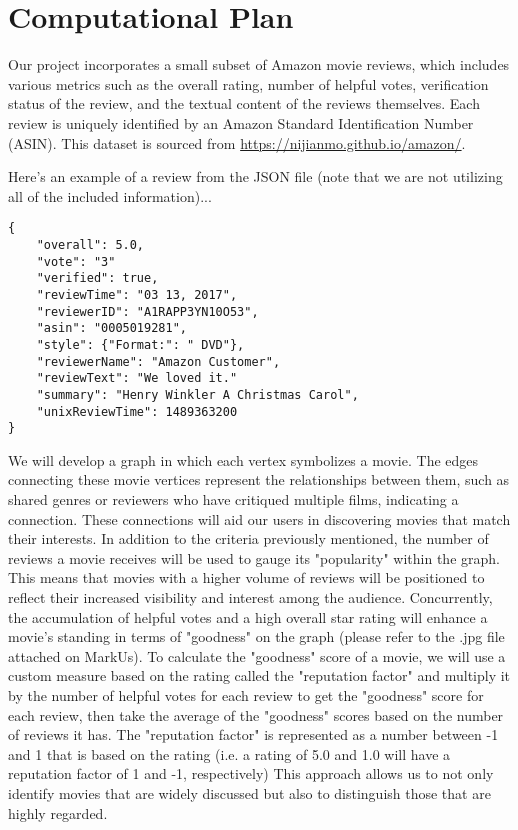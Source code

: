 \documentclass[fontsize=11pt]{article}
\begin{document}
\section*{Computational Plan}

\noindent Our project incorporates a small subset of Amazon movie reviews, which includes various metrics such as the overall rating, number of helpful votes, verification status of the review, and the textual content of the reviews themselves. Each review is uniquely identified by an Amazon Standard Identification Number (ASIN). This dataset is sourced from \url{https://nijianmo.github.io/amazon/}.
\vspace{0.6cm}

\noindent Here's an example of a review from the JSON file (note that we are not utilizing all of the included information)...
\vspace{0.1cm}

\begin{lstlisting}
{
    "overall": 5.0,
    "vote": "3"
    "verified": true, 
    "reviewTime": "03 13, 2017", 
    "reviewerID": "A1RAPP3YN10O53", 
    "asin": "0005019281", 
    "style": {"Format:": " DVD"}, 
    "reviewerName": "Amazon Customer", 
    "reviewText": "We loved it."
    "summary": "Henry Winkler A Christmas Carol", 
    "unixReviewTime": 1489363200
}
\end{lstlisting}
\vspace{0.6cm}

\noindent We will develop a graph in which each vertex symbolizes a movie. The edges connecting these movie vertices represent the relationships between them, such as shared genres or reviewers who have critiqued multiple films, indicating a connection. These connections will aid our users in discovering movies that match their interests. 
In addition to the criteria previously mentioned, the number of reviews a movie receives will be used to gauge its "popularity" within the graph. This means that movies with a higher volume of reviews will be positioned to reflect their increased visibility and interest among the audience. Concurrently, the accumulation of helpful votes and a high overall star rating will enhance a movie's standing in terms of "goodness" on the graph (please refer to the .jpg file attached on MarkUs). To calculate the "goodness" score of a movie, we will use a custom measure based on the rating called the "reputation factor" and multiply it by the number of helpful votes for each review to get the "goodness" score for each review, then take the average of the "goodness" scores based on the number of reviews it has. The "reputation factor" is represented as a number between -1 and 1 that is based on the rating (i.e. a rating of 5.0 and 1.0 will have a reputation factor of 1 and -1, respectively) This approach allows us to not only identify movies that are widely discussed but also to distinguish those that are highly regarded.
\vspace{0.6cm}
\end{document}
